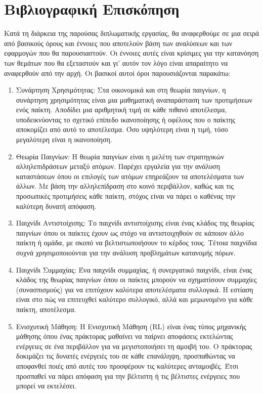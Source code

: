 \section{Βιβλιογραφική Επισκόπηση}

Κατά τη διάρκεια της παρούσας διπλωματικής εργασίας, θα αναφερθούμε σε μια σειρά από βασικούς όρους και έννοιες που αποτελούν βάση των αναλύσεων και των εφαρμογών που θα παρουσιαστούν. Οι έννοιες αυτές είναι κρίσιμες για την κατανόηση των θεμάτων που θα εξεταστούν και γι' αυτόν τον λόγο είναι απαραίτητο να αναφερθούν από την αρχή. Οι βασικοί αυτοί όροι παρουσιάζονται παρακάτω:

\begin{enumerate}
    \item Συνάρτηση Χρησιμότητας: Στα οικονομικά και στη θεωρία παιγνίων, η συνάρτηση χρησιμότητας είναι μια μαθηματική αναπαράσταση των προτιμήσεων ενός παίκτη. Αποδίδει μια αριθμητική τιμή σε κάθε πιθανό αποτέλεσμα, υποδεικνύοντας το σχετικό επίπεδο ικανοποίησης ή οφέλους που ο παίκτης αποκομίζει από αυτό το αποτέλεσμα. Όσο υψηλότερη είναι η τιμή, τόσο μεγαλύτερη είναι η ικανοποίηση. 

    \item Θεωρία Παιγνίων: Η θεωρία παιγνίων είναι η μελέτη των στρατηγικών αλληλεπιδράσεων μεταξύ ατόμων. Παρέχει εργαλεία για την ανάλυση καταστάσεων όπου οι επιλογές των ατόμων επηρεάζουν τα αποτελέσματα των άλλων. Με βάση την αλληλεπίδραση στο κοινό περιβάλλον, καθώς και τις προσωπικές προτιμήσεις κάθε παίκτη, στόχος είναι να πάρει ο καθένας την καλύτερη δυνατή απόφαση. 

    \item Παιχνίδι Αντιστοίχισης: Το παιχνίδι αντιστοίχισης είναι ένας κλάδος της θεωρίας παιγνίων όπου οι παίκτες έχουν ως στόχο να αντιστοιχηθούν σε κάποιον άλλο παίκτη ή ομάδα, με σκοπό να βελτιστωποιήσουν το κέρδος τους. Τέτοια παιχνίδια συχνά χρησιμοποιούνται για την ανάλυση προβλημάτων κατανομής πόρων. 

    \item Παιχνίδι Συμμαχίας: Ένα παιχνίδι συμμαχίας, ή συνεργατικό παιχνίδι, είναι ένας κλάδος της θεωρίας παιγνίων όπου οι παίκτες μπορούν να σχηματίσουν συμμαχίες (συνασπισμούς) για να επιτύχουν καλύτερα αποτελέσματα συλλογικά. Η εστίαση είναι στο πώς να επιτευχθεί καλύτερο συλλογικό, αλλά και μεμωνομένο για κάθε παίκτη, αποτέλεσμα. 

    \item Ενισχυτική Μάθηση: Η Ενισχυτική Μάθηση (RL) είναι ένας τύπος μηχανικής μάθησης όπου ένας πράκτορας μαθαίνει να παίρνει αποφάσεις εκτελώντας ενέργειες σε ένα περιβάλλον για να μεγιστοποιήσει τη αμοιβή του. Ο πράκτορας δοκιμάζει τις δυνατές ενέργειές του σε κάθε επανάληψη, προσπαθώντας να αποφανθεί ποιές από αυτές του προσφέρουν τις καλύτερες ανταμοιβές. Έτσι προσπαθεί να πάρει απόφαση για την βέλτιστη ή τις βέλτιστες ενέργειες που μπορεί να εκτελέσει. 


\end{enumerate}

